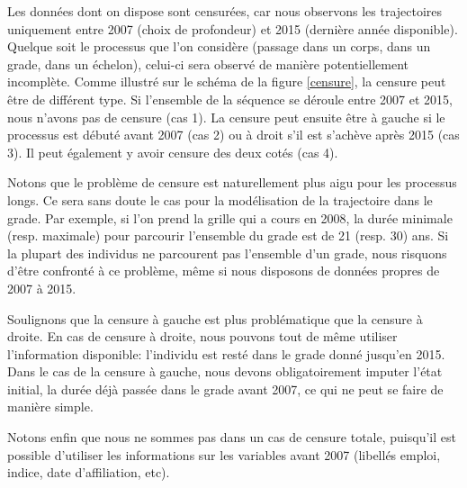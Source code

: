\documentclass[11pt,a4paper]{article}
\begin{document}
Les données dont on dispose sont censurées, car nous observons les trajectoires uniquement entre 2007 (choix de profondeur) et 2015 (dernière année disponible). Quelque soit le processus que l'on considère (passage dans un corps, dans un grade, dans un échelon), celui-ci sera observé de manière potentiellement incomplète. Comme illustré sur le schéma de la figure  \ref{censure}, la censure peut être de différent type. Si l'ensemble de la séquence se déroule entre 2007 et 2015, nous n'avons pas de censure (cas 1). La censure peut ensuite être à gauche si le processus est débuté avant 2007 (cas 2) ou à droit s'il est s'achève après 2015 (cas 3). Il peut également y avoir censure des deux cotés (cas 4). 

Notons que le problème de censure est naturellement plus aigu pour les processus longs. Ce sera sans doute le cas pour la modélisation de la trajectoire dans le grade. Par exemple, si l'on prend la grille qui a cours en 2008, la durée minimale (resp. maximale) pour parcourir l'ensemble du grade est de 21 (resp. 30) ans. Si la plupart des individus ne parcourent pas l'ensemble d'un grade, nous risquons d'être confronté à ce problème, même si nous disposons de données propres de 2007 à 2015. 

Soulignons que la censure à gauche est plus problématique que la censure à droite. En cas de censure à droite, nous pouvons tout de même utiliser l'information disponible: l'individu est resté dans le grade donné jusqu'en 2015. Dans  le cas de la censure à gauche, nous devons obligatoirement imputer l'état initial, la durée déjà passée dans le grade avant 2007, ce qui ne peut se faire de manière simple. 

Notons enfin que nous ne sommes pas dans un cas de censure totale, puisqu'il est possible d'utiliser les informations sur les variables avant 2007 (libellés emploi, indice, date d'affiliation, etc). 
\end{document}
